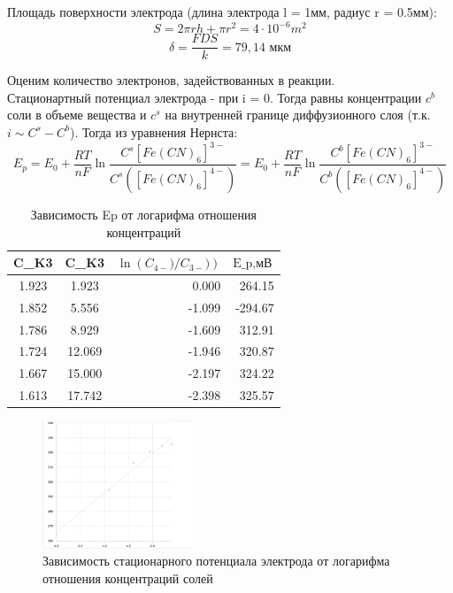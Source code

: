 \documentclass[a4paper,12pt]{article}
\begin{document}
Площадь поверхности электрода (длина электрода l = 1мм, радиус r = 0.5мм):
\begin{equation*}
    S = 2 \pi rh + \pi r^2 = 4 \cdot 10^{-6} m^2
\end{equation*}
$$
\delta = \frac{FDS}{k} = 79,14 \text{ мкм}
$$

Оценим количество электронов, задействованных в реакции.\\
Стационартный потенциал электрода - при i = 0. Тогда равны концентрации $c^b$ соли в объеме вещества и $c^s$ на внутренней границе диффузионного слоя (т.к. $i \sim C^s - C^b$). Тогда из уравнения Нернста:
\begin{equation*}
    E_p = E_0 + \frac{RT}{nF}\ln{\frac{C^s[Fe(CN)_6]^{3-}}{C^s([Fe(CN)_6]^{4-})}} =  E_0 + \frac{RT}{nF}\ln{\frac{C^b[Fe(CN)_6]^{3-}}{C^b([Fe(CN)_6]^{4-})}}
\end{equation*}
\begin{table}[h!]
\centering
{%
\begin{tabular}{|c|c|r|r|}
\hline
C_{K3} & C_{K3} & \multicolumn{1}{c|}{$\ln ({C_{4-})} /{C_{3-})} )$} & \multicolumn{1}{c|}{$\mbox{E_p}, \mbox{мВ}$} \\ \hline
1.923 & 1.923 & 0.000 & 264.15 \\ \hline
1.852 & 5.556 & -1.099 & -294.67 \\ \hline
1.786 & 8.929 & -1.609 & 312.91 \\ \hline
1.724 & 12.069 & -1.946 & 320.87 \\ \hline
1.667 & 15.000 & -2.197 & 324.22 \\ \hline
1.613 & 17.742 & -2.398 & 325.57 \\ \hline
\end{tabular}%
}
\caption{Зависимость Ep от логарифма отношения концентраций}
\label{tab:my-table}
\end{table}

\begin{figure}[h!]
    \centering
    \includegraphics[width = 0.4\textwidth]{301.png}
    \caption{Зависимость стационарного потенциала электрода от логарифма отношения концентраций солей}
    \label{fig:no_int}
\end{figure}\\
\end{document}
